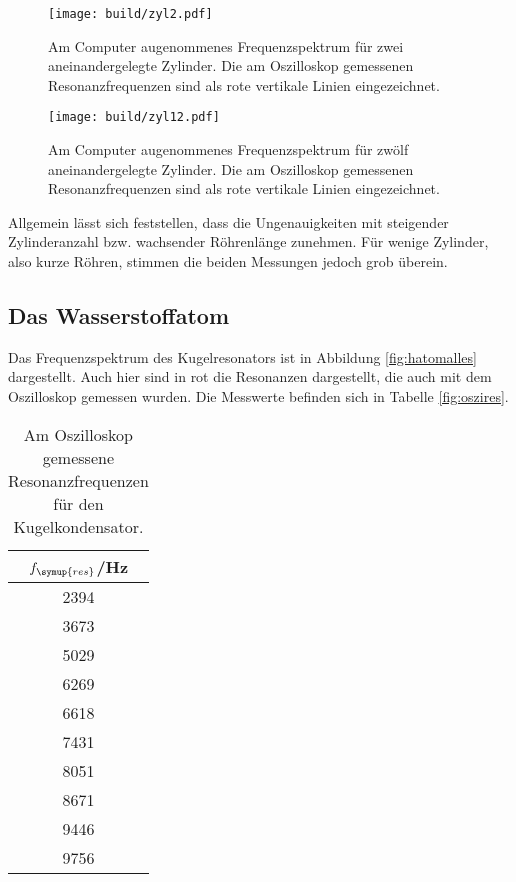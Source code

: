 \begin{figure}
  \centering
  \texttt{[image: build/zyl2.pdf]}
  \caption{Am Computer augenommenes Frequenzspektrum für zwei aneinandergelegte
  Zylinder. Die am Oszilloskop gemessenen Resonanzfrequenzen sind als rote vertikale
  Linien eingezeichnet.}
  \label{fig:zyl2}
\end{figure}
\begin{figure}
  \centering
  \texttt{[image: build/zyl12.pdf]}
  \caption{Am Computer augenommenes Frequenzspektrum für zwölf aneinandergelegte
  Zylinder. Die am Oszilloskop gemessenen Resonanzfrequenzen sind als rote vertikale
  Linien eingezeichnet.}
  \label{fig:zyl12}
\end{figure}


Allgemein lässt sich feststellen, dass die Ungenauigkeiten mit steigender Zylinderanzahl
bzw. wachsender Röhrenlänge zunehmen. Für wenige Zylinder, also kurze Röhren, stimmen
die beiden Messungen jedoch grob überein.

\subsection{Das Wasserstoffatom}
\label{subsec:hatom}

Das Frequenzspektrum des Kugelresonators ist in Abbildung \ref{fig:hatomalles} dargestellt.
Auch hier sind in rot die Resonanzen dargestellt, die auch mit dem Oszilloskop
gemessen wurden. Die Messwerte befinden sich in Tabelle \ref{fig:oszires}.

\begin{table}[htp]
	\begin{center}
    \caption{Am Oszilloskop gemessene Resonanzfrequenzen für den Kugelkondensator.}
		\label{tab:oszires}
		\begin{tabular}{c}
		\toprule
			{$f_\symup{res}$/Hz}\\
			\midrule
			2394\\
			3673\\
			5029\\
			6269\\
			6618\\
			7431\\
			8051\\
			8671\\
			9446\\
			9756\\
		\bottomrule
		\end{tabular}
	\end{center}
\end{table}

